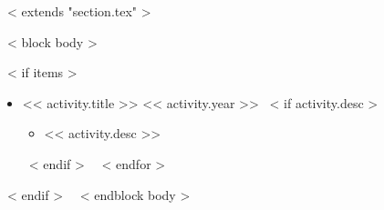 ~< extends "section.tex" >~

~< block body >~

~< if items >~
\begin{itemize}
   ~< for activity in items >~
   \item << activity.title >> \hfill << activity.year >>
   ~< if activity.desc >~
   \begin{itemize}
     \item << activity.desc >>
   \end{itemize}
   ~< endif >~
   ~< endfor >~
\end{itemize}
~< endif >~
~< endblock body >~
